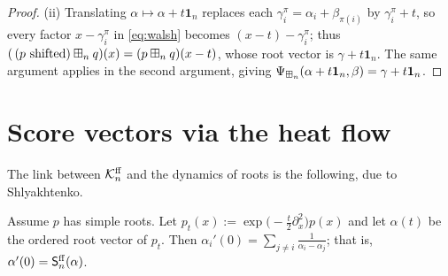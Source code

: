 \begin{proof}
\smallskip\noindent
(ii) Translating $\alpha\mapsto\alpha+t\mathbf 1_n$ replaces each
$\gamma_i^\pi=\alpha_i+\beta_{\pi(i)}$ by $\gamma_i^\pi+t$, so every factor
$x-\gamma_i^\pi$ in \eqref{eq:walsh} becomes $(x-t)-\gamma_i^\pi$; thus
$(\,(p\text{ shifted})\boxplus_n q)(x)=(p\boxplus_n q)(x-t)$, whose root vector is
$\gamma+t\mathbf 1_n$. The same argument applies in the second argument, giving
$\Psi_{\boxplus_n}(\alpha+t\mathbf 1_n,\beta)=\gamma+t\mathbf 1_n$.
\end{proof}

\section*{Score vectors via the heat flow}

The link between $\mathcal{K}^{\mathrm{ff}}_n$ and the dynamics of roots is the following, due to
Shlyakhtenko.

\begin{qfourlemma}\label{lem:heat}
Assume $p$ has simple roots. Let $p_t(x):=\exp\!\bigl(-\tfrac{t}{2}\partial_x^2\bigr)p(x)$
and let $\alpha(t)$ be the ordered root vector of $p_t$. Then
$\alpha_i'(0)=\sum_{j\ne i}\frac{1}{\alpha_i-\alpha_j}$; that is,
$\alpha'(0)=\mathsf{S}^{\mathrm{ff}}_n(\alpha)$.
\end{qfourlemma}

